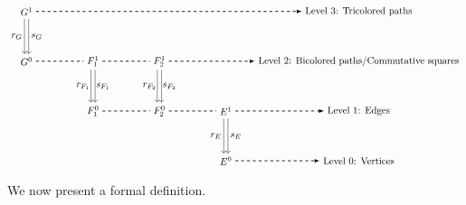 \documentclass[a4paper,reqno,12pt]{amsart}
\theoremstyle{definition}
\theoremstyle{remark}
\begin{document}
\[
\begin{tikzpicture}[scale=1.2]
\node[] (A) at (0,1.5) {$F_2^1$};
\node[] (B) at (0,0) {$F_2^0$};	
\node[] (C) at (2,0) {$E^1$};
\node[] (D) at (2,-1.5) {$E^0$};
\node[] (E) at (-4,3) {$G^1$};
\node[] (F) at (-4,1.5) {$G^0$};	
\node[] (G) at (-2,1.5) {$F_1^1$};
\node[] (H) at (-2,0) {$F_1^0$};

\node[] (X) at (6,-1.5) {Level 0: Vertices};
\node[] (Y) at (6,0) {Level 1: Edges};
\node[] (Z) at (6,1.5) {Level 2: Bicolored paths/Commutative squares};
\node[] (W) at (6,3) {Level 3: Tricolored paths};

\draw[transform canvas={xshift=0.5ex}, ->] (A) -- (B);
\draw[transform canvas={xshift=-0.5ex}, ->] (A) -- (B);

\draw[transform canvas={xshift=0.5ex}, ->] (C) -- (D);
\draw[transform canvas={xshift=-0.5ex}, ->] (C) -- (D);

\draw[transform canvas={xshift=0.5ex}, ->] (E) -- (F);
\draw[transform canvas={xshift=-0.5ex}, ->] (E) -- (F);

\draw[transform canvas={xshift=0.5ex}, ->] (G) -- (H);
\draw[transform canvas={xshift=-0.5ex}, ->] (G) -- (H);

\draw[dashed, thick] (H) -- (B);
\draw[dashed, thick] (B) -- (C);
\draw[dashed, thick] (F) -- (G);
\draw[dashed, thick] (G) -- (A);

\path[->, dashed, >=latex,thick] (E) edge [left] node {} (W);
\path[->, dashed, >=latex,thick] (A) edge [left] node {} (Z);
\path[->, dashed, >=latex,thick] (C) edge [left] node {} (Y);
\path[->, dashed, >=latex,thick] (D) edge [left] node {} (X);

\node at (-4.3,2.25) {$r_G$};
\node at (-3.7,2.25) {$s_G$};

\node at (-2.3,0.75) {$r_{F_1}$};
\node at (-1.7,0.75) {$s_{F_1}$};

\node at (-0.3,0.75) {$r_{F_2}$};
\node at (0.3,0.75) {$s_{F_2}$};

\node at (1.7,-0.75) {$r_E$};
\node at (2.3,-0.75) {$s_E$};
\end{tikzpicture}
\] 
We now present a formal definition.
\end{document}
